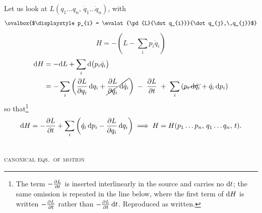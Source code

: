 \documentclass[11pt]{article}
\begin{document}
Let us look at $L(q_{1}\ldots q_{n},\,\dot q_{1}\ldots \dot q_{n})$, with
\[
\ovalbox{$\displaystyle p_{i} = \evalat{\pd{L}{\dot q_{i}}}{\dot q_{j},\,q_{j}}$}
\]
\[
H = -\left(L - \sum_{i} p_{i}\dot q_{i}\right)
\]
\begin{align*}
\mathrm{d} H &= -\mathrm{d} L + \sum_{i} \mathrm{d}\bigl(p_{i}\dot q_{i}\bigr)\\
     &= -\sum_{i}\left(\frac{\partial L}{\partial q_{i}}\,\mathrm{d} q_{i}
        + \cancel{\frac{\partial L}{\partial \dot q_{i}}\,\mathrm{d}\dot q_{i}}\right)
        \;-\;\frac{\partial L}{\partial t}\;
        +\;\sum_{i}\left(\cancel{p_{i}\,\mathrm{d}\dot q_{i}} + \dot q_{i}\,\mathrm{d} p_{i}\right)
\end{align*}
so that\footnote{The term $-\frac{\partial L}{\partial t}$ is inserted interlinearly in the source and
carries no $\mathrm{d} t$; the same omission is repeated in the line below, where the first
term of $\mathrm{d} H$ is written $-\frac{\partial L}{\partial t}$ rather than $-\frac{\partial L}{\partial t}\,\mathrm{d} t$. Reproduced as
written.}
\[
\mathrm{d} H = -\frac{\partial L}{\partial t} + \sum_{i}\left(\dot q_{i}\,\mathrm{d} p_{i}
  - \frac{\partial L}{\partial q_{i}}\,\mathrm{d} q_{i}\right)
\;\Longrightarrow\;
H = H(p_{1}\ldots p_{n},\, q_{1}\ldots q_{n},\, t).
\]

\begin{center}
\\[3pt]
\textsc{canonical eqs.\ of motion}
\end{center}
\end{document}
